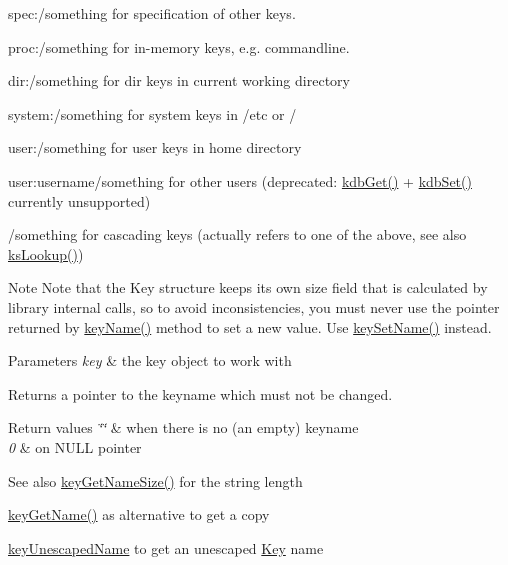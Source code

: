 \begin{DoxyItemize}
\item {\ttfamily spec\+:/something} for specification of other keys.
\item {\ttfamily proc\+:/something} for in-\/memory keys, e.\+g. commandline.
\item {\ttfamily dir\+:/something} for dir keys in current working directory
\item {\ttfamily system\+:/something} for system keys in /etc or /
\item {\ttfamily user\+:/something} for user keys in home directory
\item {\ttfamily user\+:username/something} for other users (deprecated\+: \hyperlink{group__kdb_ga28e385fd9cb7ccfe0b2f1ed2f62453a1}{kdb\+Get()} + \hyperlink{group__kdb_ga11436b058408f83d303ca5e996832bcf}{kdb\+Set()} currently unsupported)
\item {\ttfamily /something} for cascading keys (actually refers to one of the above, see also \hyperlink{group__keyset_ga60f1ddcf23272f2b29b90e92ebe9b56f}{ks\+Lookup()})

\begin{DoxyNote}{Note}
Note that the Key structure keeps its own size field that is calculated by library internal calls, so to avoid inconsistencies, you must never use the pointer returned by \hyperlink{group__keyname_ga8e805c726a60da921d3736cda7813513}{key\+Name()} method to set a new value. Use \hyperlink{group__keyname_ga7699091610e7f3f43d2949514a4b35d9}{key\+Set\+Name()} instead.
\end{DoxyNote}

\begin{DoxyParams}{Parameters}
{\em key} & the key object to work with \\
\hline
\end{DoxyParams}
\begin{DoxyReturn}{Returns}
a pointer to the keyname which must not be changed. 
\end{DoxyReturn}

\begin{DoxyRetVals}{Return values}
{\em \char`\"{}\char`\"{}} & when there is no (an empty) keyname \\
\hline
{\em 0} & on N\+U\+LL pointer \\
\hline
\end{DoxyRetVals}
\begin{DoxySeeAlso}{See also}
\hyperlink{group__keyname_gabdbcfa51ed8a387e47ead207affa2d2e}{key\+Get\+Name\+Size()} for the string length 

\hyperlink{group__keyname_gab29a850168d9b31c9529e90cf9ab68be}{key\+Get\+Name()} as alternative to get a copy 

\hyperlink{group__keyname_ga6fe6af4c27b35d911a533f4ae4d698bb}{key\+Unescaped\+Name} to get an unescaped \hyperlink{group__key}{Key} name 
\end{DoxySeeAlso}

\end{DoxyItemize}\mbox{\label{group__keyname_ga6e804bd453f98c28b0ff51430d1df407}} 
